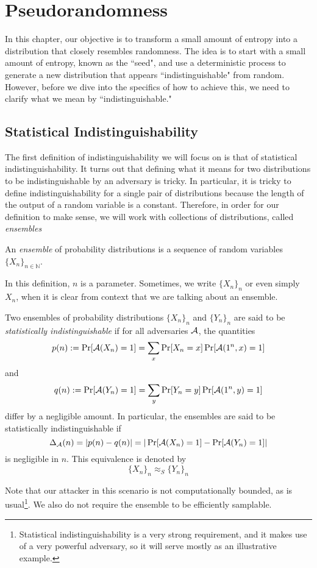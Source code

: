 \chapter{Pseudorandomness}
In this chapter, our objective is to transform a small amount of entropy into a distribution that closely resembles randomness.
The idea is to start with a small amount of entropy, known as the ``seed", and use a deterministic process to generate a new distribution that appears ``indistinguishable" from random. 
However, before we dive into the specifics of how to achieve this, we need to clarify what we mean by ``indistinguishable."

\section{Statistical Indistinguishability}
The first definition of indistinguishability we will focus on is that of statistical indistinguishability.
It turns out that defining what it means for two distributions to be indistinguishable by an adversary is tricky.
In particular, it is tricky to define indistinguishability for a single pair of distributions because the length of the output of a random variable is a constant.
Therefore, in order for our definition to make sense, we will work with collections of distributions, called \emph{ensembles}
\begin{definition}
An \emph{ensemble} of probability distributions is a sequence of random variables $\{X_n\}_{n\in \mathbb{N}}$. 
\end{definition}
In this definition, $n$ is a parameter.
Sometimes, we write $\{X_n\}_n$ or even simply $X_n$, when it is clear from context that we are talking about an ensemble.

\begin{definition}
    Two ensembles of probability distributions $\{X_n\}_n$ and $\{Y_n\}_n$ are said to be \emph{statistically indistinguishable} if for all adversaries $\mathcal{A}$, the quantities
    $$p(n) := \Pr[\mathcal{A}(X_n) = 1] = \sum_x \Pr[X_n = x]\Pr[\mathcal{A}(1^n,x) = 1]$$
    and
    $$q(n) := \Pr[\mathcal{A}(Y_n) = 1] = \sum_y \Pr[Y_n = y]\Pr[\mathcal{A}(1^n,y) = 1]$$
    differ by a negligible amount.
    In particular, the ensembles are said to be statistically indistinguishable if
    $$\Delta_{\mathcal{A}}(n) = |p(n) - q(n)| = |\Pr[\mathcal{A}(X_n) = 1] - \Pr[\mathcal{A}(Y_n) = 1]|$$
    is negligible in $n$.
This equivalence is denoted by
$$\{X_n\}_n \approx_S \{Y_n\}_n$$
\end{definition}
Note that our attacker in this scenario is not computationally bounded, as is usual\footnote{Statistical indistinguishability is a very strong requirement, and it makes use of a very powerful adversary, so it will serve mostly as an illustrative example.}.
We also do not require the ensemble to be efficiently samplable.

